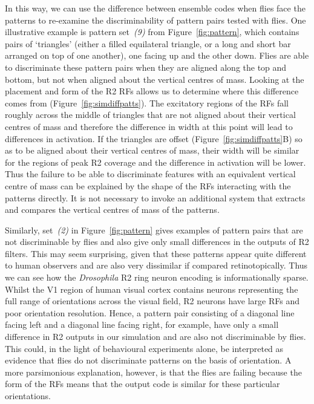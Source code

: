 In this way, we can use the difference between ensemble codes when flies face the patterns to re-examine the discriminability of pattern pairs tested with flies. One illustrative example is pattern set~\emph{(9)} from Figure~\ref{fig:pattern}, which contains pairs of ‘triangles’ (either a filled equilateral triangle, or a long and short bar arranged on top of one another), one facing up and the other down. Flies are able to discriminate these pattern pairs when they are aligned along the top and bottom, but not when aligned about the vertical centres of mass\cite{Ernst1999}. Looking at the placement and form of the R2 \acp{RF} allows us to determine where this difference comes from (Figure~\ref{fig:simdiffpatts}). The excitatory regions of the \acp{RF} fall roughly across the middle of triangles that are not aligned about their vertical centres of mass and therefore the difference in width at this point will lead to differences in activation. If the triangles are offset (Figure~\ref{fig:simdiffpatts}B) so as to be aligned about their vertical centres of mass, their width will be similar for the regions of peak R2 coverage and the difference in activation will be lower. Thus the failure to be able to discriminate features with an equivalent vertical centre of mass can be explained by the shape of the \acp{RF} interacting with the patterns directly. It is not necessary to invoke an additional system that extracts and compares the vertical centres of mass of the patterns.

Similarly, set~\emph{(2)} in Figure~\ref{fig:pattern} gives examples of pattern pairs that are not discriminable by flies and also give only small differences in the outputs of R2 filters. This may seem surprising, given that these patterns appear quite different to human observers and are also very dissimilar if compared retinotopically. Thus we can see how the \emph{Drosophila} R2 ring neuron encoding is informationally sparse. Whilst the V1 region of human visual cortex contains neurons representing the full range of orientations across the visual field, R2 neurons have large \acp{RF} and poor orientation resolution. Hence, a pattern pair consisting of a diagonal line facing left and a diagonal line facing right, for example, have only a small difference in R2 outputs in our simulation and are also not discriminable by flies. This could, in the light of behavioural experiments alone, be interpreted as evidence that flies do not discriminate patterns on the basis of orientation. A more parsimonious explanation, however, is that the flies are failing because the form of the \acp{RF} means that the output code is similar for these particular orientations.

